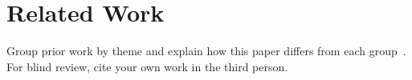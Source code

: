 \section{Related Work}
\label{sec:related}

Group prior work by theme and explain how this paper differs from each group~\cite{dosovitskiy2021vit}.
For blind review, cite your own work in the third person.
